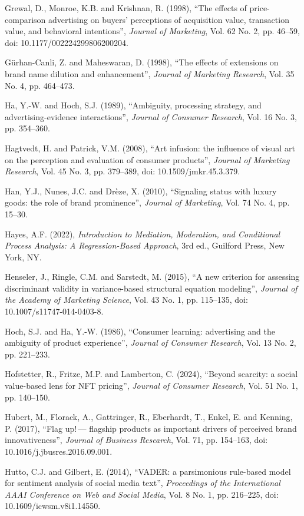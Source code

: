 \documentclass[12pt, a4paper]{article}
\newenvironment{referenceshang}{%
  \par\begingroup
  \setlength{\parindent}{0pt}%
  \setlength{\parskip}{0.5\baselineskip}%
  \everypar{\hangindent=1.5em\hangafter=1\relax}%
  \ignorespaces
}{%
  \par\endgroup
}
\begin{document}
\begin{referenceshang}
Grewal, D., Monroe, K.B. and Krishnan, R. (1998), ``The effects of price-comparison advertising on buyers' perceptions of acquisition value, transaction value, and behavioral intentions'', \emph{Journal of Marketing}, Vol. 62 No. 2, pp. 46--59, doi: 10.1177/002224299806200204.

G\"urhan-Canli, Z. and Maheswaran, D. (1998), ``The effects of extensions on brand name dilution and enhancement'', \emph{Journal of Marketing Research}, Vol. 35 No. 4, pp. 464--473.

Ha, Y.-W. and Hoch, S.J. (1989), ``Ambiguity, processing strategy, and advertising-evidence interactions'', \emph{Journal of Consumer Research}, Vol. 16 No. 3, pp. 354--360.

Hagtvedt, H. and Patrick, V.M. (2008), ``Art infusion: the influence of visual art on the perception and evaluation of consumer products'', \emph{Journal of Marketing Research}, Vol. 45 No. 3, pp. 379--389, doi: 10.1509/jmkr.45.3.379.

Han, Y.J., Nunes, J.C. and Dr\`eze, X. (2010), ``Signaling status with luxury goods: the role of brand prominence'', \emph{Journal of Marketing}, Vol. 74 No. 4, pp. 15--30.

Hayes, A.F. (2022), \emph{Introduction to Mediation, Moderation, and Conditional Process Analysis: A Regression-Based Approach}, 3rd ed., Guilford Press, New York, NY.

Henseler, J., Ringle, C.M. and Sarstedt, M. (2015), ``A new criterion for assessing discriminant validity in variance-based structural equation modeling'', \emph{Journal of the Academy of Marketing Science}, Vol. 43 No. 1, pp. 115--135, doi: 10.1007/s11747-014-0403-8.

Hoch, S.J. and Ha, Y.-W. (1986), ``Consumer learning: advertising and the ambiguity of product experience'', \emph{Journal of Consumer Research}, Vol. 13 No. 2, pp. 221--233.

Hofstetter, R., Fritze, M.P. and Lamberton, C. (2024), ``Beyond scarcity: a social value-based lens for NFT pricing'', \emph{Journal of Consumer Research}, Vol. 51 No. 1, pp. 140--150.

Hubert, M., Florack, A., Gattringer, R., Eberhardt, T., Enkel, E. and Kenning, P. (2017), ``Flag up!\,--- flagship products as important drivers of perceived brand innovativeness'', \emph{Journal of Business Research}, Vol. 71, pp. 154--163, doi: 10.1016/j.jbusres.2016.09.001.

Hutto, C.J. and Gilbert, E. (2014), ``VADER: a parsimonious rule-based model for sentiment analysis of social media text'', \emph{Proceedings of the International AAAI Conference on Web and Social Media}, Vol. 8 No. 1, pp. 216--225, doi: 10.1609/icwsm.v8i1.14550.


\end{referenceshang}
\end{document}
